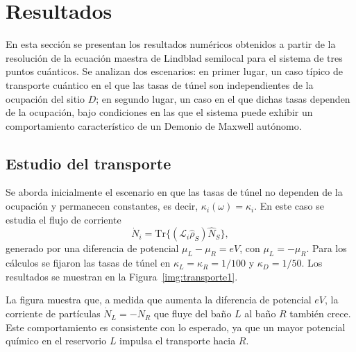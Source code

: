 \label{sec5:dem}

\newpage

\section{Resultados}

En esta sección se presentan los resultados numéricos obtenidos a partir de la resolución de la ecuación maestra de Lindblad semilocal para el sistema de tres puntos cuánticos. Se analizan dos escenarios: en primer lugar, un caso típico de transporte cuántico en el que las tasas de túnel son independientes de la ocupación del sitio $D$; en segundo lugar, un caso en el que dichas tasas dependen de la ocupación, bajo condiciones en las que el sistema puede exhibir un comportamiento característico de un Demonio de Maxwell autónomo.  

\subsection{Estudio del transporte}

Se aborda inicialmente el escenario en que las tasas de túnel no dependen de la ocupación y permanecen constantes, es decir, $\kappa_{i}(\omega) = \kappa_{i}$. En este caso se estudia el flujo de corriente
\[
\dot{N}_{i} = \mathrm{Tr}\{(\mathcal{L}_{i}\hat{\rho}_{S})\hat{N}_{S}\},
\]
generado por una diferencia de potencial $\mu_{L} - \mu_{R} = eV$, con $\mu_{L}=-\mu_{R}$. Para los cálculos se fijaron las tasas de túnel en $\kappa_{L} = \kappa_{R} = 1/100$ y $\kappa_{D} = 1/50$. Los resultados se muestran en la Figura~\ref{img:transporte1}.  


La figura muestra que, a medida que aumenta la diferencia de potencial $eV$, la corriente de partículas $\dot{N}_L = -\dot{N}_R$ que fluye del baño $L$ al baño $R$ también crece. Este comportamiento es consistente con lo esperado, ya que un mayor potencial químico en el reservorio $L$ impulsa el transporte hacia $R$.  

